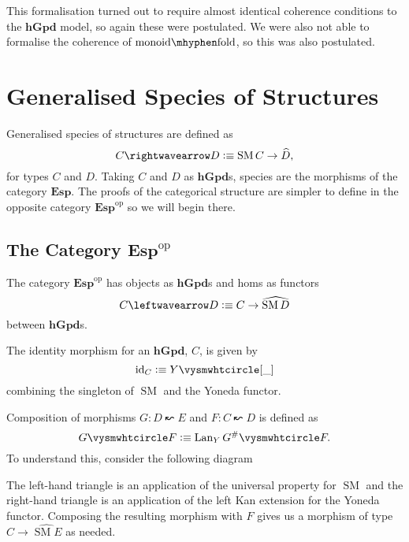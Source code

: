 \documentclass[12pt, parskip, DIV=14]{scrbook}
\newcommand{\defeq}{\vcentcolon\equiv}
\renewcommand{\circ}{\vysmwhtcircle}
\newcommand{\SM}{\operatorname{SM}}
\newcommand{\hGpd}{\mathbf{hGpd}}
\newcommand{\Lan}{\operatorname{Lan}}
\newcommand{\monfold}{\operatorname{monoid\mhyphen fold}}
\newcommand{\Esp}{\mathbf{Esp}}
\newcommand{\op}[1]{#1^\mathrm{op}}
\newcommand{\id}{\operatorname{id}}
\begin{document}
This formalisation turned out to require almost identical coherence conditions to the $\hGpd$ model, so again these were postulated. We were also not able to formalise the coherence of $\monfold$, so this was also postulated.

\chapter{Generalised Species of Structures}

Generalised species of structures \citep{fiore2008cartesian} are defined as
$$C \rightwavearrow D \defeq \SM C \to \widehat{D},$$
for types $C$ and $D$. Taking $C$ and $D$ as $\hGpd$s, species are the morphisms of the category $\Esp$. The proofs of the categorical structure are simpler to define in the opposite category $\op\Esp$ so we will begin there.

\section{The Category $\op\Esp$}

The category $\op\Esp$ has objects as $\hGpd$s and homs as functors
$$C \leftwavearrow D \defeq C \to \widehat{\SM D}$$
between $\hGpd$s.

The identity morphism for an $\hGpd$, $C$, is given by
$$\id_C \defeq Y \circ [\_]$$
combining the singleton of $\SM$ and the Yoneda functor.

Composition of morphisms $G : D \leftwavearrow E$ and $F : C \leftwavearrow D$ is defined as
$$G \circ F \defeq \Lan_Y G^\# \circ F.$$
To understand this, consider the following diagram
\begin{center}
\end{center}
The left-hand triangle is an application of the universal property for $\SM$ and the right-hand triangle is an application of the left Kan extension for the Yoneda functor. Composing the resulting morphism with $F$ gives us a morphism of type $C \to \widehat{\SM E}$ as needed.
\end{document}
